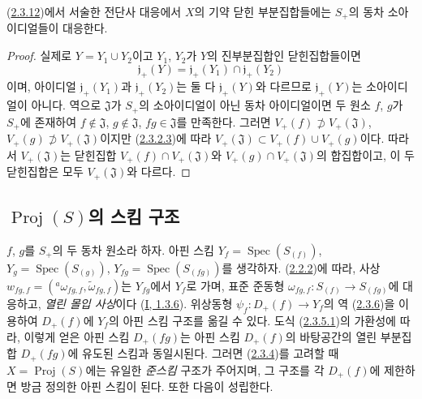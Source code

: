 \begin{corollary}[2.3.17]
\label{II.2.3.17-ko}
(\hyperref[II.2.3.12-ko]{2.3.12})에서 서술한 전단사 대응에서 $X$의
기약 닫힌 부분집합들에는 $S_+$의 동차 소아이디얼들이 대응한다.
\end{corollary}

\begin{proof}
실제로 $Y=Y_1\cup Y_2$이고 $Y_1$, $Y_2$가 $Y$의 진부분집합인
닫힌집합들이면
\[
  \mathfrak{j}_+(Y)
  =\mathfrak{j}_+(Y_1)\cap\mathfrak{j}_+(Y_2)
\]
이며, 아이디얼 $\mathfrak{j}_+(Y_1)$과 $\mathfrak{j}_+(Y_2)$는 둘 다
$\mathfrak{j}_+(Y)$와 다르므로 $\mathfrak{j}_+(Y)$는 소아이디얼이
아니다. 역으로 $\mathfrak{J}$가 $S_+$의 소아이디얼이 아닌 동차
아이디얼이면 두 원소 $f$, $g$가 $S_+$에 존재하여
$f\notin\mathfrak{J}$, $g\notin\mathfrak{J}$, $fg\in\mathfrak{J}$를
만족한다. 그러면
$V_+(f)\not\supset V_+(\mathfrak{J})$,
$V_+(g)\not\supset V_+(\mathfrak{J})$이지만
(\hyperref[II.2.3.2.3-ko]{2.3.2.3})에 따라
$V_+(\mathfrak{J})\subset V_+(f)\cup V_+(g)$이다. 따라서
$V_+(\mathfrak{J})$는 닫힌집합
$V_+(f)\cap V_+(\mathfrak{J})$와
$V_+(g)\cap V_+(\mathfrak{J})$의 합집합이고, 이 두 닫힌집합은 모두
$V_+(\mathfrak{J})$와 다르다.
\end{proof}

\subsection{$\operatorname{Proj}(S)$의 스킴 구조}
\label{subsection:II.2.4-ko}

\begin{env}[2.4.1]
\label{II.2.4.1-ko}
$f$, $g$를 $S_+$의 두 동차 원소라 하자. 아핀 스킴
$Y_f=\operatorname{Spec}(S_{(f)})$,
$Y_g=\operatorname{Spec}(S_{(g)})$,
$Y_{fg}=\operatorname{Spec}(S_{(fg)})$를 생각하자.
(\hyperref[II.2.2.2-ko]{2.2.2})에 따라, 사상
$w_{fg,f}=({}^a\omega_{fg,f},\widetilde{\omega}_{fg,f})$는 $Y_{fg}$에서
$Y_f$로 가며, 표준 준동형
$\omega_{fg,f}:S_{(f)}\to S_{(fg)}$에 대응하고,
\emph{열린 몰입 사상}이다
(\hyperref[I.1.3.6-ko]{I, 1.3.6}).
위상동형 $\psi_f:D_+(f)\to Y_f$의 역
(\hyperref[II.2.3.6-ko]{2.3.6})을 이용하여 $D_+(f)$에 $Y_f$의 아핀
스킴 구조를 옮길 수 있다. 도식
(\hyperref[II.2.3.5.1-ko]{2.3.5.1})의 가환성에 따라, 이렇게 얻은 아핀
스킴 $D_+(fg)$는 아핀 스킴 $D_+(f)$의 바탕공간의 열린 부분집합
$D_+(fg)$에 유도된 스킴과 동일시된다. 그러면
(\hyperref[II.2.3.4-ko]{2.3.4})를 고려할 때
$X=\operatorname{Proj}(S)$에는 유일한 \emph{준스킴} 구조가 주어지며,
그 구조를 각 $D_+(f)$에 제한하면 방금 정의한 아핀 스킴이 된다. 또한
다음이 성립한다.
\end{env}

